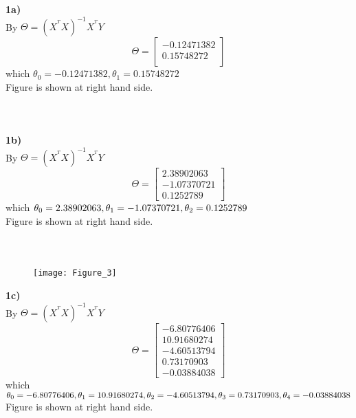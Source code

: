 \documentclass[12pt]{article}
\begin{document}
\textbf{1a)}\\
By $\Theta = (X^{^{T}}X)^{-1}X^{^{T}}Y$
\[
\Theta = \begin{bmatrix}
-0.12471382\\0.15748272\\
\end{bmatrix}
\]
which $\theta_{0} = -0.12471382, \theta_{1} = 0.15748272$\\[0.2in]
Figure is shown at right hand side.\paragraph{\\[0.4in]}
\textbf{1b)}\\
By $\Theta = (X^{^{T}}X)^{-1}X^{^{T}}Y$
\[
\Theta = \begin{bmatrix}
2.38902063\\-1.07370721\\0.1252789
\end{bmatrix}
\]
which $\theta_{0} = 2.38902063, \theta_{1} = -1.07370721,\\ \theta_{2} = 0.1252789$\\[0.2in] 
Figure is shown at right hand side. \paragraph{\\[0.0in]}
\newpage
{}
\begin{wrapfigure}[8]{r}{0.5\textwidth}
\texttt{[image: Figure\_3]}
\end{wrapfigure}
\textbf{1c)}\\
By $\Theta = (X^{^{T}}X)^{-1}X^{^{T}}Y$
\[
\Theta = \begin{bmatrix}
-6.80776406\\10.91680274\\-4.60513794\\0.73170903\\-0.03884038
\end{bmatrix}
\]
which $\theta_{0} = -6.80776406, \theta_{1} = 10.91680274,\\ \theta_{2} = -4.60513794, \theta_{3} = 0.73170903,\\ \theta_{4} = -0.03884038$\\[0.2in] 
Figure is shown at right hand side.\paragraph{\\[0.0in]}
\end{document}
